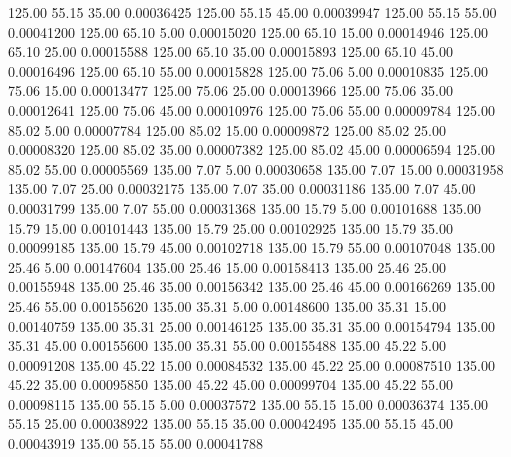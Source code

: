     125.00     55.15     35.00     0.00036425
    125.00     55.15     45.00     0.00039947
    125.00     55.15     55.00     0.00041200
    125.00     65.10      5.00     0.00015020
    125.00     65.10     15.00     0.00014946
    125.00     65.10     25.00     0.00015588
    125.00     65.10     35.00     0.00015893
    125.00     65.10     45.00     0.00016496
    125.00     65.10     55.00     0.00015828
    125.00     75.06      5.00     0.00010835
    125.00     75.06     15.00     0.00013477
    125.00     75.06     25.00     0.00013966
    125.00     75.06     35.00     0.00012641
    125.00     75.06     45.00     0.00010976
    125.00     75.06     55.00     0.00009784
    125.00     85.02      5.00     0.00007784
    125.00     85.02     15.00     0.00009872
    125.00     85.02     25.00     0.00008320
    125.00     85.02     35.00     0.00007382
    125.00     85.02     45.00     0.00006594
    125.00     85.02     55.00     0.00005569
    135.00      7.07      5.00     0.00030658
    135.00      7.07     15.00     0.00031958
    135.00      7.07     25.00     0.00032175
    135.00      7.07     35.00     0.00031186
    135.00      7.07     45.00     0.00031799
    135.00      7.07     55.00     0.00031368
    135.00     15.79      5.00     0.00101688
    135.00     15.79     15.00     0.00101443
    135.00     15.79     25.00     0.00102925
    135.00     15.79     35.00     0.00099185
    135.00     15.79     45.00     0.00102718
    135.00     15.79     55.00     0.00107048
    135.00     25.46      5.00     0.00147604
    135.00     25.46     15.00     0.00158413
    135.00     25.46     25.00     0.00155948
    135.00     25.46     35.00     0.00156342
    135.00     25.46     45.00     0.00166269
    135.00     25.46     55.00     0.00155620
    135.00     35.31      5.00     0.00148600
    135.00     35.31     15.00     0.00140759
    135.00     35.31     25.00     0.00146125
    135.00     35.31     35.00     0.00154794
    135.00     35.31     45.00     0.00155600
    135.00     35.31     55.00     0.00155488
    135.00     45.22      5.00     0.00091208
    135.00     45.22     15.00     0.00084532
    135.00     45.22     25.00     0.00087510
    135.00     45.22     35.00     0.00095850
    135.00     45.22     45.00     0.00099704
    135.00     45.22     55.00     0.00098115
    135.00     55.15      5.00     0.00037572
    135.00     55.15     15.00     0.00036374
    135.00     55.15     25.00     0.00038922
    135.00     55.15     35.00     0.00042495
    135.00     55.15     45.00     0.00043919
    135.00     55.15     55.00     0.00041788
